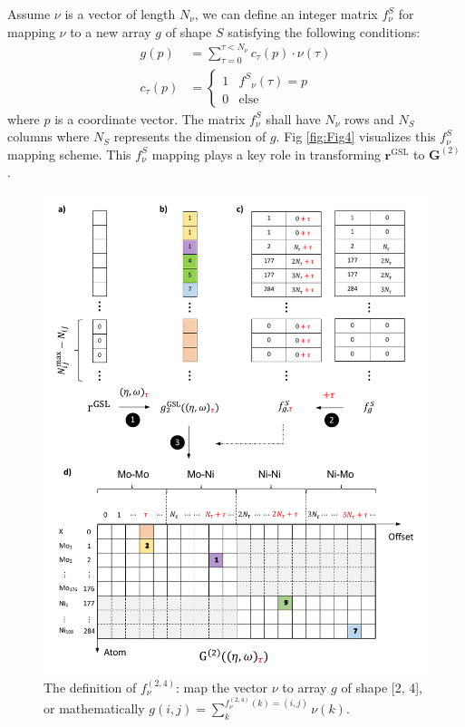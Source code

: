 \documentclass[preprint]{revtex4-2}
\begin{document}
Assume $\nu$ is a vector of length $N_{\nu}$, we can define an integer matrix 
$f^{S}_{\nu}$ for mapping $\nu$ to a new array $g$ of shape $S$ satisfying the 
following conditions:
\begin{align}
\label{eq:scatter_nd}
g(p) & = \sum_{\tau=0}^{\tau < N_{\nu}}{c_\tau(p) \cdot \nu(\tau)} \\
c_{\tau}(p) & = \begin{cases}
    1 & {f^S}_{\nu}(\tau) = p \\
    0 & \mathrm{else}
\end{cases}
\end{align}
where $p$ is a coordinate vector. The matrix $f^{S}_{\nu}$ shall have $N_{\nu}$ 
rows and $N_S$ columns where $N_S$ represents the dimension of $g$. 
Fig \ref{fig:Fig4} visualizes this $f^S_{\nu}$ mapping scheme. This $f^S_{\nu}$
mapping plays a key role in transforming $\mathbf{r}^{\mathrm{GSL}}$ to 
$\mathbf{G}^{(2)}$.

% 
%
\begin{figure}[h!]
\centering
\includegraphics[scale=0.95]{figures/Fig5.pdf}
\caption{\label{fig:Fig5} The definition of $f^{(2,4)}_{\nu}$: map the 
vector $\nu$ to array $g$ of shape [2, 4], or mathematically
$g(i,j) = \sum_{k}^{f^{(2,4)}_{\nu}(k) = (i,j)}{\nu(k)}$.
}
\end{figure}
\end{document}
